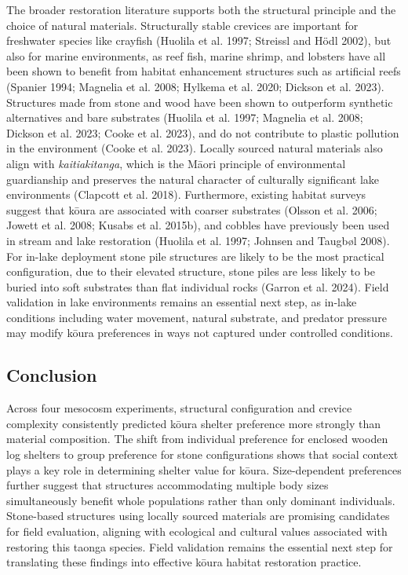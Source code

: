 \documentclass[
  12pt,
  a4paper,
  oneside]{scrbook}
\begin{document}
The broader restoration literature supports both the structural
principle and the choice of natural materials. Structurally stable
crevices are important for freshwater species like crayfish (Huolila et
al. 1997; Streissl and Hödl 2002), but also for marine environments, as
reef fish, marine shrimp, and lobsters have all been shown to benefit
from habitat enhancement structures such as artificial reefs (Spanier
1994; Magnelia et al. 2008; Hylkema et al. 2020; Dickson et al. 2023).
Structures made from stone and wood have been shown to outperform
synthetic alternatives and bare substrates (Huolila et al. 1997;
Magnelia et al. 2008; Dickson et al. 2023; Cooke et al. 2023), and do
not contribute to plastic pollution in the environment (Cooke et al.
2023). Locally sourced natural materials also align with
\emph{kaitiakitanga}, which is the Māori principle of environmental
guardianship and preserves the natural character of culturally
significant lake environments (Clapcott et al. 2018). Furthermore,
existing habitat surveys suggest that kōura are associated with coarser
substrates (Olsson et al. 2006; Jowett et al. 2008; Kusabs et al.
2015b), and cobbles have previously been used in stream and lake
restoration (Huolila et al. 1997; Johnsen and Taugbøl 2008). For in-lake
deployment stone pile structures are likely to be the most practical
configuration, due to their elevated structure, stone piles are less
likely to be buried into soft substrates than flat individual rocks
(Garron et al. 2024). Field validation in lake environments remains an
essential next step, as in-lake conditions including water movement,
natural substrate, and predator pressure may modify kōura preferences in
ways not captured under controlled conditions.

\subsection{Conclusion}\label{conclusion}

Across four mesocosm experiments, structural configuration and crevice
complexity consistently predicted kōura shelter preference more strongly
than material composition. The shift from individual preference for
enclosed wooden log shelters to group preference for stone
configurations shows that social context plays a key role in determining
shelter value for kōura. Size-dependent preferences further suggest that
structures accommodating multiple body sizes simultaneously benefit
whole populations rather than only dominant individuals. Stone-based
structures using locally sourced materials are promising candidates for
field evaluation, aligning with ecological and cultural values
associated with restoring this taonga species. Field validation remains
the essential next step for translating these findings into effective
kōura habitat restoration practice.
\end{document}
